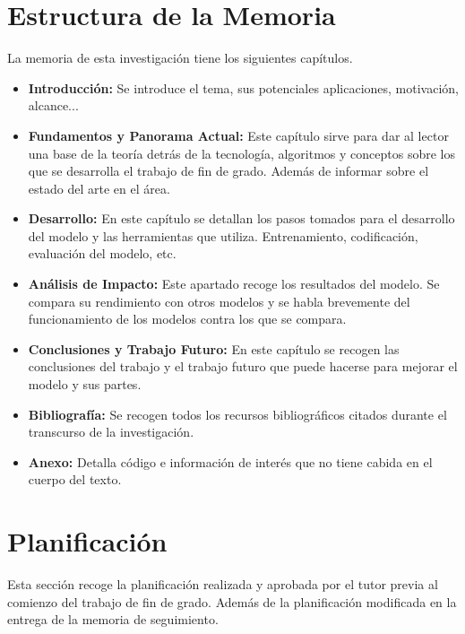 \section{Estructura de la Memoria}
\label{sec:estructuramemoria}
La memoria de esta investigación tiene los siguientes capítulos.
\begin{itemize}
	\item \textbf{Introducción: } Se introduce el tema, sus potenciales aplicaciones, motivación, alcance... 
	\item \textbf{Fundamentos y Panorama Actual: } Este capítulo sirve para dar al lector una base de la teoría detrás de la tecnología, algoritmos y conceptos sobre los que se desarrolla el trabajo de fin de grado. Además de informar sobre el estado del arte en el área.
	\item \textbf{Desarrollo: } En este capítulo se detallan los pasos tomados para el desarrollo del modelo y las herramientas que utiliza. Entrenamiento, codificación, evaluación del modelo, etc. 
	\item \textbf{Análisis de Impacto: } Este apartado recoge los resultados del modelo. Se compara su rendimiento con otros modelos y se habla brevemente del funcionamiento de los modelos contra los que se compara.
	\item \textbf{Conclusiones y Trabajo Futuro: } En este capítulo se recogen las conclusiones del trabajo y el trabajo futuro que puede hacerse para mejorar el modelo y sus partes. 
	\item \textbf{Bibliografía: } Se recogen todos los recursos bibliográficos citados durante el transcurso de la investigación.
	\item \textbf{Anexo: } Detalla código e información de interés que no tiene cabida en el cuerpo del texto. 
\end{itemize}

\section{Planificación}
\label{sec:planificacion}
Esta sección recoge la planificación realizada y aprobada por el tutor previa al comienzo del trabajo de fin de grado. Además de la planificación modificada en la entrega de la memoria de seguimiento.
